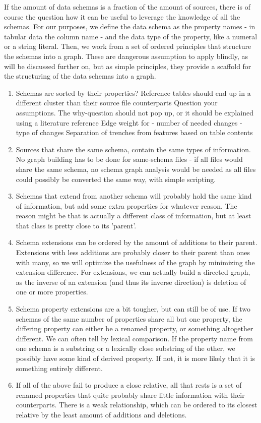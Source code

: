 \documentclass[12pt,twoside,a4paper]{article}
\begin{document}
If the amount of data schemas is a fraction of the amount of sources, there is of course the question how it can be useful to leverage the knowledge of all the schemas. For our purposes, we define the data schema as the property names - in tabular data the column name - and the data type of the property, like a numeral or a string literal. Then, we work from a set of ordered principles that structure the schemas into a graph. These are dangerous assumption to apply blindly, as will be discussed further on, but as simple principles, they provide a scaffold for the structuring of the data schemas into a graph. 
\begin{enumerate}
\item
Schemas are sorted by their properties?
Reference tables should end up in a different cluster than their source file counterparts
Question your assumptions. The why-question should not pop up, or it should be explained using a literature reference 
Edge weight for 
- number of needed changes
- type of changes
Separation of trenches from features based on table contents
\item 
Sources that share the same schema, contain the same types of information. No graph building has to be done for same-schema files - if all files would share the same schema, no schema graph analysis would be needed as all files could possibly be converted the same way, with simple scripting.
\item Schemas that extend from another schema will probably hold the same kind of information, but add some extra properties for whatever reason. The reason might be that is actually a different class of information, but at least that class is pretty close to its 'parent'. 
\item Schema extensions can be ordered by the amount of additions to their parent. Extensions with less additions are probably closer to their parent than ones with many, so we will optimize the usefulness of the graph by minimizing the extension difference. For extensions, we can actually build a directed graph, as the inverse of an extension (and thus its inverse direction) is deletion of one or more properties.
\item Schema property extensions are a bit tougher, but can still be of use. If two schemas of the same number of properties share all but one property, the differing property can either be a renamed property, or something altogether different. We can often tell by lexical comparison. If the property name from one schema is a substring or a lexically close substring of the other, we possibly have some kind of derived property. If not, it is more likely that it is something entirely different.
\item If all of the above fail to produce a close relative, all that rests is a set of renamed properties that quite probably share little information with their counterparts. There is a weak relationship, which can be ordered to its closest relative by the least amount of additions and deletions.
\end{enumerate}



\end{document}

